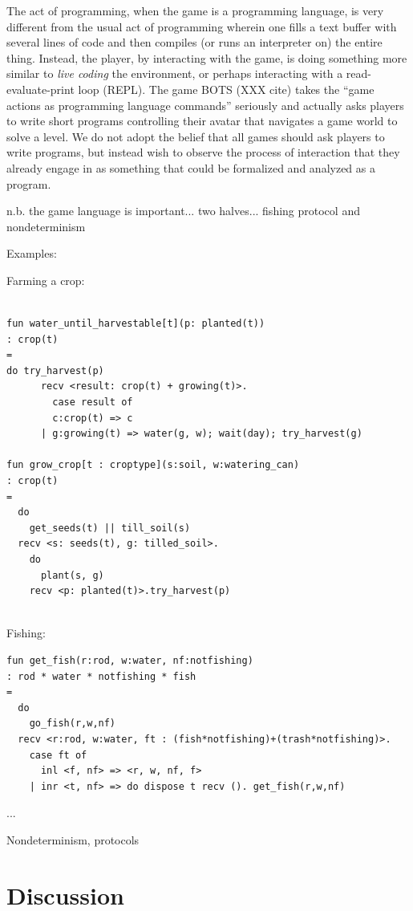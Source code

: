 \documentclass[sigconf]{acmart}
\begin{document}
The act of programming, when the game is a programming language, is very
different from the usual act of programming wherein one fills a text buffer
with several lines of code and then compiles (or runs an interpreter on)
the entire thing. Instead, the player, by interacting with the game, is
doing something more similar to {\em live coding} the environment, or
perhaps interacting with a read-evaluate-print loop (REPL). The game BOTS
(XXX cite) takes the ``game actions as programming language commands''
seriously and actually asks players to write short programs controlling
their avatar that navigates a game world to solve a level. We do not adopt
the belief that all games should ask players to write programs, but instead
wish to observe the process of interaction that they already engage in as
something that could be formalized and analyzed as a program.

n.b. the game language is important... two halves...
fishing protocol and nondeterminism

Examples:

Farming a crop:
\begin{verbatim}

fun water_until_harvestable[t](p: planted(t))
: crop(t)
=
do try_harvest(p)
      recv <result: crop(t) + growing(t)>.
        case result of
        c:crop(t) => c
      | g:growing(t) => water(g, w); wait(day); try_harvest(g)

fun grow_crop[t : croptype](s:soil, w:watering_can)
: crop(t)
=
  do
    get_seeds(t) || till_soil(s)
  recv <s: seeds(t), g: tilled_soil>.
    do
      plant(s, g)
    recv <p: planted(t)>.try_harvest(p)
        
\end{verbatim}

Fishing:
\begin{verbatim}
fun get_fish(r:rod, w:water, nf:notfishing) 
: rod * water * notfishing * fish
=
  do  
    go_fish(r,w,nf)
  recv <r:rod, w:water, ft : (fish*notfishing)+(trash*notfishing)>.
    case ft of
      inl <f, nf> => <r, w, nf, f>
    | inr <t, nf> => do dispose t recv (). get_fish(r,w,nf)
\end{verbatim}

...

Nondeterminism, protocols

\section{Discussion}
\end{document}
